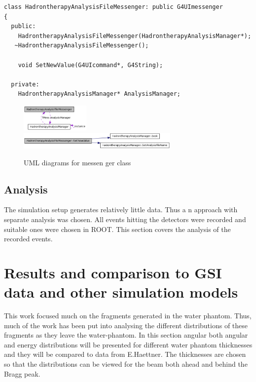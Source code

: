 \scriptsize
\begin{verbatim}
class HadrontherapyAnalysisFileMessenger: public G4UImessenger
{
  public:
    HadrontherapyAnalysisFileMessenger(HadrontherapyAnalysisManager*);
   ~HadrontherapyAnalysisFileMessenger();
    
    void SetNewValue(G4UIcommand*, G4String);
    
  private:
    HadrontherapyAnalysisManager* AnalysisManager;
\end{verbatim}
\normalsize
\begin{figure}[h] 
\begin{center}
\includegraphics[width=0.3\textwidth]{images/setFileNameMessenger_1.png}  
\includegraphics[width=0.7\textwidth]{images/setFileNameMessenger_2.png}  
\caption{\label{fig:messengerUML} UML diagrams for messen ger class}
 
 \end{center}
 \end{figure}

\subsection{Analysis}
The simulation setup generates relatively little data. Thus a n approach with separate analysis was chosen. All events hitting the detectors were recorded and suitable ones were chosen in ROOT. This section covers the analysis of the recorded events.

\section{Results and comparison to GSI data and other simulation models}

This work focused much on the fragments generated in the water phantom. Thus, much of the work has been put into analysing the different distributions of these fragments as they leave the water-phantom. In this section angular both angular and energy distributions will be presented for different water phantom thicknesses and they will be compared to data from E.Haettner. The thicknesses are chosen so that the distributions can be viewed for the beam both ahead and behind the Bragg peak.

